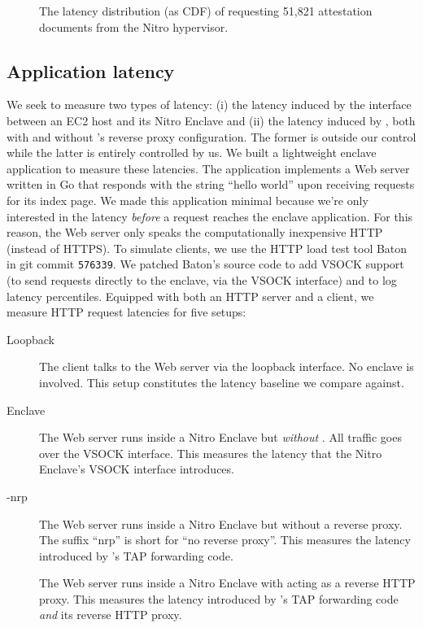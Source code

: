 \begin{figure}[t]
    \centering
    
    \caption{The latency distribution (as CDF) of requesting 51,821
    attestation documents from the Nitro hypervisor.}\label{fig:att-perf}
\end{figure}

\subsection{Application latency}%
\label{sec:latency}

We seek to measure two types of latency: (i) the latency induced by the
interface between an EC2 host and its Nitro Enclave and (ii) the latency induced
by \tool{}, both with and without \tool{}'s reverse proxy configuration.  The
former is outside our control while the latter is entirely controlled by us.  We
built a lightweight enclave application to measure these latencies.  The
application implements a Web server written in Go that responds with the string
``hello world'' upon receiving requests for its index page.  We made this
application minimal because we're only interested in the latency \emph{before} a
request reaches the enclave application.  For this reason, the Web server only
speaks the computationally inexpensive HTTP (instead of HTTPS).  To simulate
clients, we use the HTTP load test tool Baton~\cite{baton} in git commit
\texttt{576339}.  We patched Baton's source code to add VSOCK support (to send
requests directly to the enclave, via the VSOCK interface) and to log latency
percentiles.  Equipped with both an HTTP server and a client, we measure HTTP
request latencies for five setups:

\begin{description}
  \item[Loopback] The client talks to the Web server via the loopback interface.
    No enclave is involved.  This setup constitutes the latency baseline we
    compare against.

  \item[Enclave] The Web server runs inside a Nitro Enclave but \emph{without
    \tool{}}.  All traffic goes over the VSOCK interface.  This measures the
    latency that the Nitro Enclave's VSOCK interface introduces.

  \item[\Tool{}-nrp] The Web server runs inside a Nitro Enclave but without a
    reverse proxy.  The suffix ``nrp'' is short for ``no reverse proxy''.  This
    measures the latency introduced by \tool{}'s TAP forwarding code.

  \item[\Tool{}] The Web server runs inside a Nitro Enclave with \tool{} acting
    as a reverse HTTP proxy.  This measures the latency introduced by \tool{}'s
    TAP forwarding code \emph{and} its reverse HTTP proxy.
\end{description}

